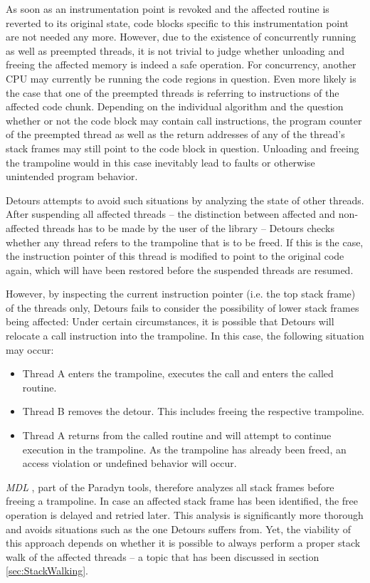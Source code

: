 As soon as an instrumentation point is revoked and the affected routine is reverted to
its original state, code blocks specific to this instrumentation point are not needed 
any more. However, due to the existence of concurrently running as well as preempted threads, it 
is not trivial to judge whether unloading and freeing the affected memory is indeed a safe operation. For
concurrency, another CPU may currently be running the code regions in question. Even
more likely is the case that one of the preempted threads is referring to instructions
of the affected code chunk. Depending on the individual algorithm and the question whether
or not the code block may contain call instructions, the program counter 
of the preempted thread as well as the return addresses of any of the thread's stack frames
may still point to the code block in question. Unloading and freeing the trampoline 
would in this case inevitably lead to faults or otherwise unintended 
program behavior. 

Detours \cite{Brubacher99} attempts to avoid such situations by analyzing the state of other threads. After
suspending all affected threads -- the distinction between affected and 
non-affected threads has to be made by the user of the library -- Detours checks whether
any thread refers to the trampoline that is to be freed. If this is the case, the
instruction pointer of this thread is modified to point to the original code again, which 
will have been restored before the suspended threads are resumed.

However, by inspecting the current instruction pointer (i.e. the top stack frame) of the threads 
only, Detours fails to consider the possibility of lower stack frames being 
affected: Under certain circumstances, it is possible that Detours will relocate 
a call instruction into the trampoline. In this case, the following situation may occur:
\begin{itemize}
	\item Thread A enters the trampoline, executes the call and enters the called routine.
	\item Thread B removes the detour. This includes freeing the respective trampoline.
	\item Thread A returns from the called routine and will attempt to continue execution
				in the trampoline. As the trampoline has already been freed, an access violation
				or undefined behavior will occur.
\end{itemize}

\emph{MDL} \cite{hollingsworth97mdl}, part of the Paradyn tools, therefore analyzes 
all stack frames before freeing a trampoline. In case an affected stack frame has been
identified, the free operation is delayed and retried later. This analysis is 
significantly more thorough and avoids situations such as the one Detours suffers from.
Yet, the viability of this approach depends on whether it is possible to always 
perform a proper stack walk of the affected threads -- a topic that has been
discussed in section \ref{sec:StackWalking}.

